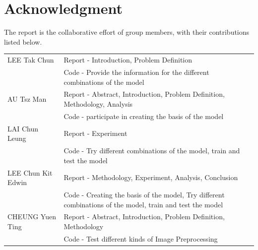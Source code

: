 \documentclass[journal,onecolumn]{IEEEtran}
\begin{document}


\section*{Acknowledgment}


The report is the collaborative effort of group members, with their contributions listed below.\\

\begin{tabular}{l l}
  \hline
  LEE Tak Chun & Report - Introduction, Problem Definition \\ 
  {} & Code - Provide the information for the different combinations of the model\\
  AU Tsz Man & Report - Abstract, Introduction, Problem Definition, Methodology, Analysis \\ 
  {} & Code - participate in creating the basis of the model\\
  LAI Chun Leung & Report - Experiment \\ 
  {} & Code - Try different combinations of the model, train and test the model\\
  LEE Chun Kit Edwin & Report - Methodology, Experiment, Analysis, Conclusion \\ 
  {} & Code - Creating the basis of the model, Try different combinations of the model, train and test the model\\
  CHEUNG Yuen Ting & Report - Abstract, Introduction, Problem Definition, Methodology \\ 
  {} & Code - Test different kinds of Image Preprocessing\\
  \hline
\end{tabular}




\ifCLASSOPTIONcaptionsoff
  \newpage
\fi





\end{document}
